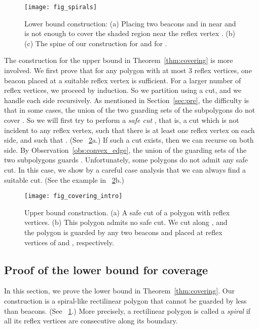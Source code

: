 \documentclass[11pt]{article}
\theoremstyle{definition}
\begin{document}
\begin{figure}[tb]
\centering
\texttt{[image: fig\_spirals]}
\caption{Lower bound construction:
(a) Placing two beacons  and  in  near  and 
 is not enough to cover the shaded region near the reflex vertex .
 (b)(c) The spine of our construction  for  and for . }
\label{fig:spirals}
\end{figure}

The construction for the upper bound in Theorem~\ref{thm:covering} is more involved. 
We first prove that for any polygon with at most 3 reflex vertices, one beacon placed
at a suitable reflex vertex is sufficient. 
For a larger number  of reflex vertices, we proceed by induction.
So we partition  using a cut, and we handle each side recursively.
As mentioned in Section~\ref{sec:pre}, the difficulty is that in some cases, the
union of the two guarding sets of the subpolygons do not cover .
So we will first try to perform a {\it safe cut} , that is, a cut  which 
is not incident to any reflex vertex,  such that there is at least one reflex
vertex on each side, and such that 
.
(See \figurename~\ref{fig:covering_intro}a.)
If such a cut exists, then we can recurse on both side. By Observation~\ref{obs:convex_edge},
the union of the guarding sets of the two subpolygons guards .
Unfortunately, some polygons do not admit any safe cut. In this case, we show
by a careful case analysis that we can always find a suitable cut. 
(See the example in \figurename~\ref{fig:covering_intro}b.)

\begin{figure}[tb]
\centering
\texttt{[image: fig\_covering\_intro]}
\caption{Upper bound construction. 
(a) A safe cut  of a polygon with  reflex vertices.
(b) This polygon admits no safe cut. We cut along  ,
and the polygon is guarded by any two beacons  and  placed at
reflex vertices of  and , respectively.
\label{fig:covering_intro}}
\end{figure}

\subsection{Proof of the lower bound for coverage}\label{subsec:lower_bound_coverage}


In this section, we prove the lower bound in Theorem~\ref{thm:covering}. Our construction is a 
spiral-like rectilinear polygon  that cannot be guarded by less than  
beacons. (See \figurename~\ref{fig:spirals}.) More precisely, a rectilinear polygon is called a \emph{spiral} if all its reflex vertices are consecutive along its boundary.
\end{document}
